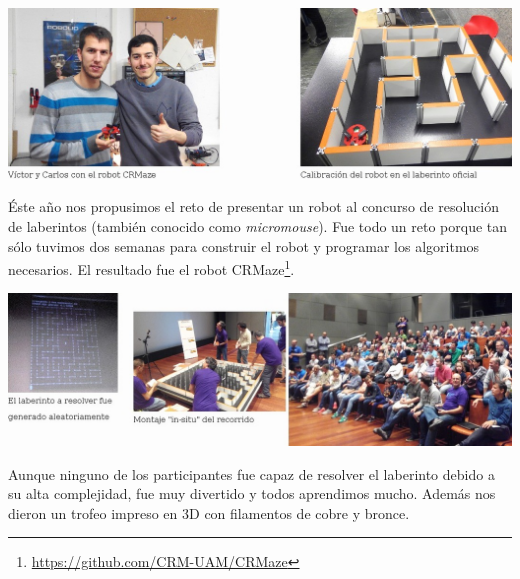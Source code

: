 \documentclass[12pt,twoside]{report}
\begin{document}
\vspace{5mm}

\centerline{\includegraphics[width=1.1\linewidth]{fotos/oshwdem2015_robot}}

Éste año nos propusimos el reto de presentar un robot al concurso de resolución de laberintos (también conocido como \emph{micromouse}). Fue todo un reto porque tan sólo tuvimos dos semanas para construir el robot y programar los algoritmos necesarios.
El resultado fue el robot CRMaze\footnote{\url{https://github.com/CRM-UAM/CRMaze}}.


\vspace{5mm}
\centerline{\includegraphics[width=1.1\linewidth]{fotos/oshwdem2015_laberinto}}


Aunque ninguno de los participantes fue capaz de resolver el laberinto debido a su alta complejidad, fue muy divertido y todos aprendimos mucho. Además nos dieron un trofeo impreso en 3D con filamentos de cobre y bronce.
\end{document}
